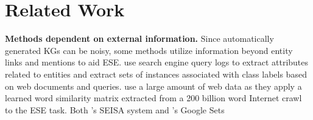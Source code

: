 \documentclass[a4paper]{article}
\newcommand{\Todo}[2][red]{\todo[]{\textcolor{#1}{\footnotesize #2}}}
\newcommand{\er}{ESE\xspace}
\newcommand{\nvge}{NVSE\xspace}
\newcommand{\mycite}[1]{\cite{#1}}%
\newcommand{\mynewcite}[1]{\cite{#1}}%
\begin{document}
\section{Related Work}
%
\noindent
{\bf Methods dependent on external information.}
Since automatically generated KGs can be noisy, 
some methods utilize information beyond entity links and mentions to aid ESE.
\mynewcite{pasca2007you} use search engine query logs to extract attributes related to
entities and \mynewcite{pacsca2008weakly} extract sets of instances associated with class
labels based on web documents and queries.
\mynewcite{pantel-EtAl:2009:EMNLP} use a large amount of web data
as they apply a learned word similarity matrix extracted from
a 200 billion word Internet crawl to the \er task.
Both \mynewcite{he2011seisa}'s SEISA system and \mynewcite{tong2008system}'s Google Sets
\end{document}
